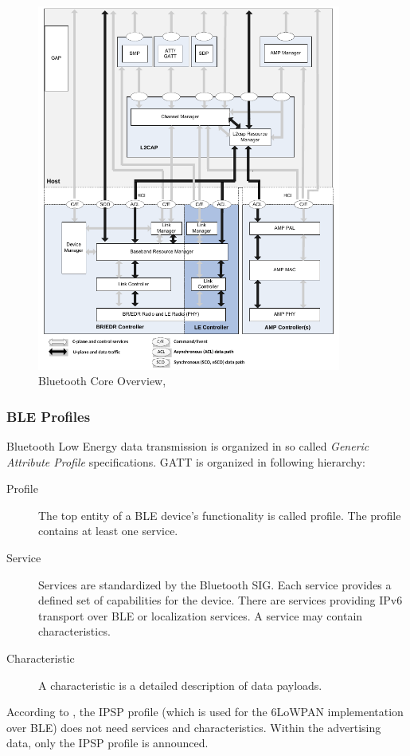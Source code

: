 \documentclass[]{scrreprt}%
\begin{document}
\begin{figure}[htb]
  \centering
  \includegraphics[width=100mm]{img/bt_core.png}
  \caption{Bluetooth Core Overview, \cite{BT01}}
\end{figure}

\subsubsection{BLE Profiles}

Bluetooth Low Energy data transmission is organized in so called \textit{Generic Attribute Profile} specifications.
GATT is organized in following hierarchy:
\begin{description}
 \item[Profile] The top entity of a BLE device's functionality is called profile. The profile contains at least one service.
 \item[Service] Services are standardized by the Bluetooth SIG. Each service provides a defined set of capabilities for the device.
 There are services providing IPv6 transport over BLE \cite{BT02} or localization services. A service may contain characteristics.
 \item[Characteristic] A characteristic is a detailed description of data payloads.
\end{description}

According to \cite{BT02}, the IPSP profile (which is used for the 6LoWPAN implementation over BLE) does not need services and characteristics.
Within the advertising data, only the IPSP profile is announced.
\end{document}
